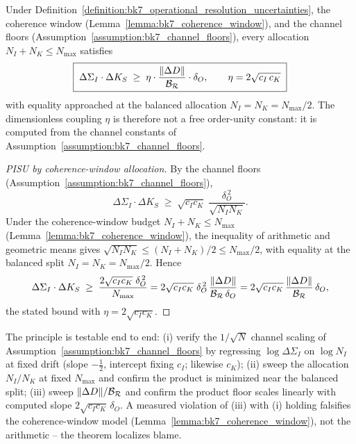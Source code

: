 \begin{theorem}
\label{theorem:bk7_pisu}
Under Definition~\ref{definition:bk7_operational_resolution_uncertainties}, the coherence window (Lemma~\ref{lemma:bk7_coherence_window}), and the channel floors (Assumption~\ref{assumption:bk7_channel_floors}), every allocation $N_I + N_K \le N_{\max}$ satisfies
\begin{equation}
\boxed{\;\Delta\Sigma_I \cdot \Delta K_S \;\geq\; \eta \cdot \frac{\|\Delta D\|}{\mathcal{B_R}} \cdot \delta_O, \qquad \eta = 2\sqrt{c_I\,c_K}\;}
\end{equation}
with equality approached at the balanced allocation $N_I = N_K = N_{\max}/2$. The dimensionless coupling $\eta$ is therefore not a free order-unity constant: it is computed from the channel constants of Assumption~\ref{assumption:bk7_channel_floors}.
\end{theorem}

\begin{proof}[PISU by coherence-window allocation]
\label{proof:bk7_pisu}
\leavevmode
By the channel floors (Assumption~\ref{assumption:bk7_channel_floors}),
\[
\Delta\Sigma_I \cdot \Delta K_S \;\ge\; \sqrt{c_I c_K}\;\frac{\delta_O^{\,2}}{\sqrt{N_I N_K}}.
\]
Under the coherence-window budget $N_I + N_K \le N_{\max}$ (Lemma~\ref{lemma:bk7_coherence_window}), the inequality of arithmetic and geometric means gives $\sqrt{N_I N_K} \le (N_I + N_K)/2 \le N_{\max}/2$, with equality at the balanced split $N_I = N_K = N_{\max}/2$. Hence
\[
\Delta\Sigma_I \cdot \Delta K_S \;\ge\; \frac{2\sqrt{c_I c_K}\;\delta_O^{\,2}}{N_{\max}} = 2\sqrt{c_I c_K}\;\delta_O^{\,2}\,\frac{\|\Delta D\|}{\mathcal{B_R}\,\delta_O} = 2\sqrt{c_I c_K}\,\frac{\|\Delta D\|}{\mathcal{B_R}}\,\delta_O,
\]
the stated bound with $\eta = 2\sqrt{c_I c_K}$.
\end{proof}

\begin{remark}
\label{remark:bk7_pisu_protocol}
The principle is testable end to end: (i) verify the $1/\sqrt{N}$ channel scaling of Assumption~\ref{assumption:bk7_channel_floors} by regressing $\log\Delta\Sigma_I$ on $\log N_I$ at fixed drift (slope $-\tfrac{1}{2}$, intercept fixing $c_I$; likewise $c_K$); (ii) sweep the allocation $N_I/N_K$ at fixed $N_{\max}$ and confirm the product is minimized near the balanced split; (iii) sweep $\|\Delta D\|/\mathcal{B_R}$ and confirm the product floor scales linearly with computed slope $2\sqrt{c_I c_K}\,\delta_O$. A measured violation of (iii) with (i) holding falsifies the coherence-window model (Lemma~\ref{lemma:bk7_coherence_window}), not the arithmetic -- the theorem localizes blame.
\end{remark}

